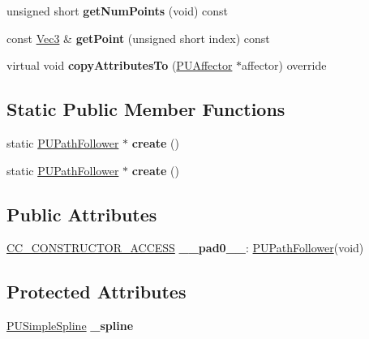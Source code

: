 \begin{DoxyCompactItemize}
unsigned short {\bfseries get\+Num\+Points} (void) const
\item 
\mbox{\label{classPUPathFollower_a57ea225b5d4a1734309cfc60cea09fb7}} 
const \hyperlink{classVec3}{Vec3} \& {\bfseries get\+Point} (unsigned short index) const
\item 
\mbox{\label{classPUPathFollower_acb754f5a309ae2eddc34ade1804b33cb}} 
virtual void {\bfseries copy\+Attributes\+To} (\hyperlink{classPUAffector}{P\+U\+Affector} $\ast$affector) override
\end{DoxyCompactItemize}
\subsection*{Static Public Member Functions}
\begin{DoxyCompactItemize}
\item 
\mbox{\label{classPUPathFollower_aaf25939a04f97826676b32fa6e1f3c15}} 
static \hyperlink{classPUPathFollower}{P\+U\+Path\+Follower} $\ast$ {\bfseries create} ()
\item 
\mbox{\label{classPUPathFollower_a6e0ba7006cce2735d36f645e407d232f}} 
static \hyperlink{classPUPathFollower}{P\+U\+Path\+Follower} $\ast$ {\bfseries create} ()
\end{DoxyCompactItemize}
\subsection*{Public Attributes}
\begin{DoxyCompactItemize}
\item 
\mbox{\label{classPUPathFollower_a98224c5ce3099c69ceaeab3a9049ab85}} 
\hyperlink{_2cocos2d_2cocos_2base_2ccConfig_8h_a25ef1314f97c35a2ed3d029b0ead6da0}{C\+C\+\_\+\+C\+O\+N\+S\+T\+R\+U\+C\+T\+O\+R\+\_\+\+A\+C\+C\+E\+SS} {\bfseries \+\_\+\+\_\+pad0\+\_\+\+\_\+}\+: \hyperlink{classPUPathFollower}{P\+U\+Path\+Follower}(void)
\end{DoxyCompactItemize}
\subsection*{Protected Attributes}
\begin{DoxyCompactItemize}
\item 
\mbox{\label{classPUPathFollower_a72b0c4e76bd55d08918ee9847841b29a}} 
\hyperlink{classPUSimpleSpline}{P\+U\+Simple\+Spline} {\bfseries \+\_\+spline}
\end{DoxyCompactItemize}
